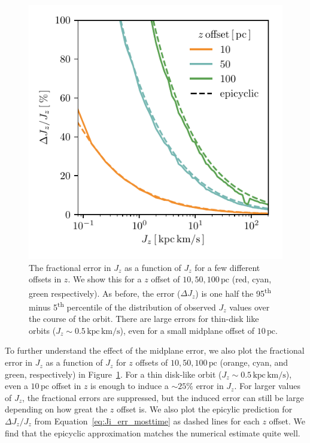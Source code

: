\documentclass[twocolumn]{aastex62}
\newcommand{\pc}{\text{pc}}
\newcommand{\kms}{\text{km}/\text{s}}
\newcommand{\actunit}{\text{kpc}\,\kms}
\newcommand{\uth}{\textsuperscript{th}}
\begin{document}
\begin{figure}
\begin{center}
\includegraphics[width=\columnwidth]{fig/schmactions_many_orbits_Jz_fun.pdf}
\end{center}
\caption{The fractional error in $J_z$ as a function of $J_z$ for a few
different offsets in $z$. We show this for a $z$ offset of $10, 50, 100\,\pc$
(red, cyan, green respectively). As before, the error ($\Delta J_z$) is one
half the 95\uth{} minus 5\uth{} percentile of the distribution of observed
$J_z$ values over the course of the orbit. There are large errors for
thin-disk like orbits ($J_z \sim 0.5\,\actunit$), even for a small midplane
offset of $10\,\pc$. }
\label{fig:dJz_fun_Jz}
\end{figure}

To further understand the effect of the midplane error, we also plot the
fractional error in $J_z$ as a function of $J_z$ for $z$ offsets of $10, 50,
100\,\pc$ (orange, cyan, and green, respectively) in
Figure~\ref{fig:dJz_fun_Jz}. For a thin disk-like orbit
($J_z\sim0.5\,\actunit$), even a $10\,\pc$ offset in $z$ is enough to induce a
$\sim25\%$ error in $J_z$. For larger values of $J_z$, the fractional errors
are suppressed, but the induced error can still be large depending on how
great the $z$ offset is. We also plot the epicylic prediction for $\Delta J_z
/ J_z$ from Equation~\eqref{eq:Ji_err_mosttime} as dashed lines for each $z$
offset. We find that the epicyclic approximation matches the numerical
estimate quite well.
\end{document}
